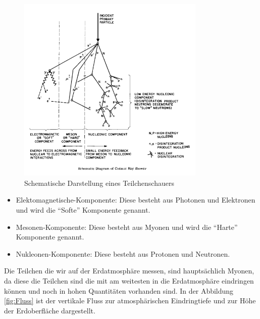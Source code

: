 \documentclass{article}
\begin{document}
\begin{figure}[H]
    \centering
    \includegraphics[width=0.8\textwidth]{figures/Teilchenschauer.png}
    \caption{Schematische Darstellung eines Teilchenschauers \cite{shower}}
    \label{fig:Teilchenschauer}
\end{figure}
\begin{itemize}
    \item Elektomagnetische-Komponente: Diese besteht aus Photonen und Elektronen und wird die \enquote{Softe} Komponente genannt.
    \item Mesonen-Komponente: Diese besteht aus Myonen und wird die \enquote{Harte} Komponente genannt.
    \item Nukleonen-Komponente: Diese besteht aus Protonen und Neutronen.
\end{itemize}
Die Teilchen die wir auf der Erdatmosphäre messen, sind hauptsächlich Myonen, da diese die Teilchen sind die mit am weitesten
in die Erdatmosphäre eindringen können und noch in hohen Quantitäten vorhanden sind.
In der Abbildung \ref{fig:Fluss} ist der vertikale Fluss zur atmosphärischen Eindringtiefe und zur Höhe der Erdoberfläche dargestellt.
\end{document}
